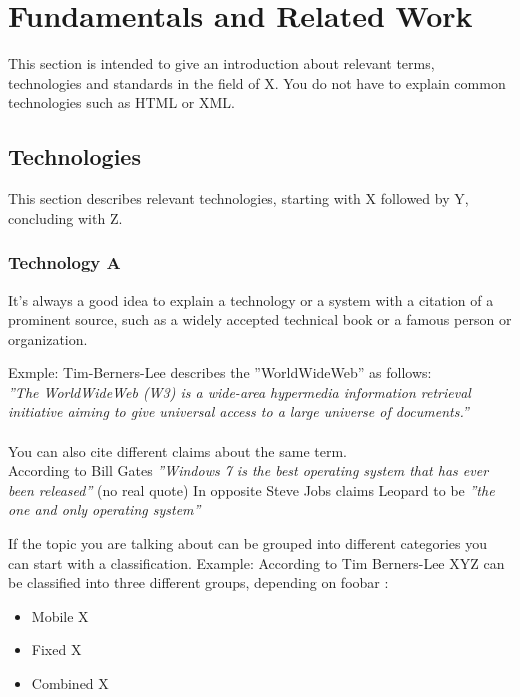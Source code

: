 \chapter{Fundamentals and Related Work\label{cha:chapter2}}

This section is intended to give an introduction about relevant terms, technologies and standards in the field of X. You do not have to explain common technologies such as HTML or XML. 

\section{Technologies \label{sec:tech}}

This section describes relevant technologies, starting with X followed by Y, concluding with Z.

\subsection{Technology A\label{sec:aaa}}

It's always a good idea to explain a technology or a system with a citation of a prominent source, such as a widely accepted technical book or a famous person or organization. 

Exmple: Tim-Berners-Lee describes the ''WorldWideWeb'' as follows:
\\
\textit{''The WorldWideWeb (W3) is a wide-area hypermedia information retrieval initiative aiming to give universal access to a large universe of documents.''} \cite{timwww}
\\
\\
You can also cite different claims about the same term.
\\
According to Bill Gates \textit{''Windows 7 is the best operating system that has ever been released''} \cite{billgates} (no real quote)
In opposite Steve Jobs claims Leopard to be \textit{''the one and only operating system''} \cite{stevejobs}

If the topic you are talking about can be grouped into different categories you can start with a classification.
Example: According to Tim Berners-Lee XYZ can be classified into three different groups, depending on foobar \cite{timwww}:
	\begin{itemize}
		\item Mobile X
				\vspace{-0.1in} 
		\item Fixed X
				\vspace{-0.1in} 
		\item Combined X
 	\end{itemize}


